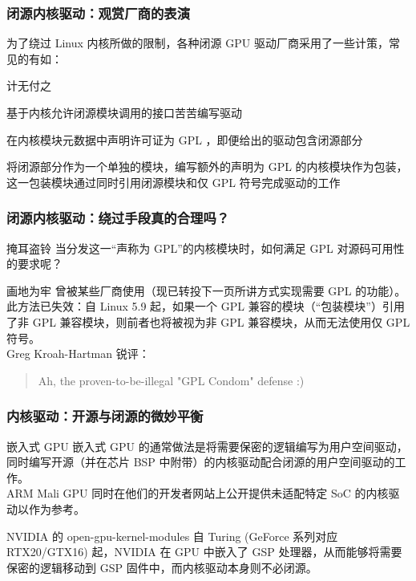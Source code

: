 \documentclass{ctexbeamer}
\begin{document}
\begin{frame}
    \frametitle{闭源内核驱动：观赏厂商的表演}
    为了绕过 Linux 内核所做的限制，各种闭源 GPU 驱动厂商采用了一些计策，常见的有如：\\
    \begin{labeling}{计无付之}
        \item [计无付之] 基于内核允许闭源模块调用的接口苦苦编写驱动
        \item [掩耳盗铃] 在内核模块元数据中声明许可证为 GPL ，即便给出的驱动包含闭源部分
        \item [画地为牢] 将闭源部分作为一个单独的模块，编写额外的声明为 GPL 的内核模块作为包装，这一包装模块通过同时引用闭源模块和仅 GPL 符号完成驱动的工作
    \end{labeling}
\end{frame}

\begin{frame}
    \frametitle{闭源内核驱动：绕过手段真的合理吗？}
    \begin{block}{掩耳盗铃}
        当分发这一“声称为 GPL”的内核模块时，如何满足 GPL 对源码可用性的要求呢？
    \end{block}
    \begin{block}{画地为牢}
        曾被某些厂商使用（现已转投下一页所讲方式实现需要 GPL 的功能）。\\
        此方法已失效：自 Linux 5.9 起，如果一个 GPL 兼容的模块（“包装模块”）引用了非 GPL 兼容模块，则前者也将被视为非 GPL 兼容模块，从而无法使用仅 GPL 符号。\\
        Greg Kroah-Hartman 锐评：
        \begin{quote}
            Ah, the proven-to-be-illegal "GPL Condom" defense :)
        \end{quote}
    \end{block}
\end{frame}

\begin{frame}
    \frametitle{内核驱动：开源与闭源的微妙平衡}
    \begin{block}{嵌入式 GPU}
        嵌入式 GPU 的通常做法是将需要保密的逻辑编写为用户空间驱动，同时编写开源（并在芯片 BSP 中附带）的内核驱动配合闭源的用户空间驱动的工作。\\
        ARM Mali GPU 同时在他们的开发者网站上公开提供未适配特定 SoC 的内核驱动以作为参考。
    \end{block}
    \begin{block}{NVIDIA 的 open-gpu-kernel-modules}
        自 Turing (GeForce 系列对应 RTX20/GTX16) 起，NVIDIA 在 GPU 中嵌入了 GSP 处理器，从而能够将需要保密的逻辑移动到 GSP 固件中，而内核驱动本身则不必闭源。
    \end{block}
\end{frame}
\end{document}
